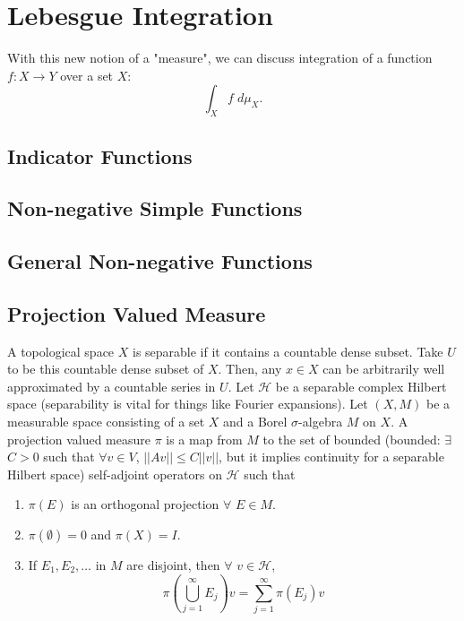 \section{Lebesgue Integration}
With this new notion of a "measure", we can discuss integration of a function $f: X\rightarrow Y$ over a set $X$:
$$
	\int_X f \; d\mu_X.
$$
\subsection{Indicator Functions}
\subsection{Non-negative Simple Functions}
\subsection{General Non-negative Functions}
\subsection{Projection Valued Measure}
A topological space $X$ is separable if it contains a countable dense subset. Take $U$ to be this countable dense subset of $X$. Then, any $x\in X$ can be arbitrarily well approximated by a countable series in $U$. Let $\mathcal{H}$ be a separable complex Hilbert space (separability is vital for things like Fourier expansions). Let $(X, M)$ be a measurable space consisting of a set $X$ and a Borel $\sigma$-algebra $M$ on $X$. A projection valued measure $\pi$ is a map from $M$ to the set of bounded (bounded: $\exists$ $C>0$ such that $\forall v\in V$, $||Av|| \le C||v||$, but it implies continuity for a separable Hilbert space) self-adjoint operators on $\mathcal{H}$ such that
\begin{enumerate}
	\item $\pi(E)$ is an orthogonal projection $\forall$ $E\in M$.
	\item $\pi(\emptyset) = 0$ and $\pi(X) = I$.
	\item If $E_1, E_2, \dots$ in $M$ are disjoint, then $\forall$ $v\in\mathcal{H}$,
	$$
		\pi\left(\bigcup^\infty_{j=1}E_j\right)v = \sum_{j=1}^\infty \pi(E_j)v
	$$
\end{enumerate}
